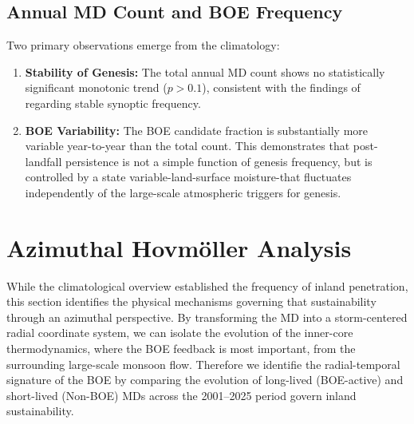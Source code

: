 \subsection{Annual MD Count and BOE Frequency}
\label{subsec:multiyear_count}


Two primary observations emerge from the climatology:
\begin{enumerate}
  \item \textbf{Stability of Genesis:} The total annual MD count
    shows no statistically significant monotonic trend ($p > 0.1$),
    consistent with the findings of \citet{mishra2021monsoon} regarding
    stable synoptic frequency.
  \item \textbf{BOE Variability:} The BOE candidate fraction is
    substantially more variable year-to-year than the total count. This
    demonstrates that post-landfall persistence is not a simple
    function of genesis frequency, but is controlled by a state
    variable-land-surface moisture-that fluctuates independently of the
    large-scale atmospheric triggers for genesis.
\end{enumerate}


\section{Azimuthal Hovm\"{o}ller Analysis}
\label{sec:results_hovmoller}

While the climatological overview established the frequency of inland
penetration, this section identifies the physical mechanisms
governing that sustainability through an azimuthal perspective. By
transforming the MD into a storm-centered radial coordinate system,
we can isolate the evolution of the inner-core thermodynamics, where
the BOE feedback is most important, from the surrounding large-scale
monsoon flow. Therefore we identifie the radial-temporal signature of the BOE by
comparing the evolution of long-lived (BOE-active) and short-lived
(Non-BOE) MDs across the 2001–2025 period govern inland
sustainability. %

